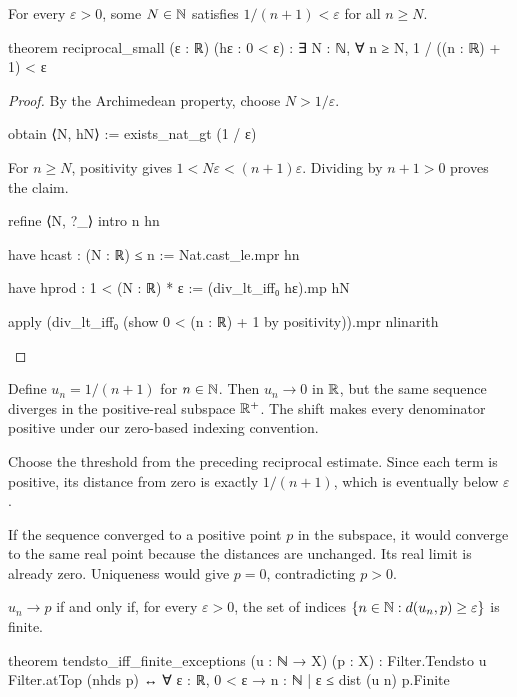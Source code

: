 \begin{lemma}
  \label{ma:lem:reciprocal-small}
  For every $\varepsilon>0$, some $N\in\mathbb{N}$ satisfies $1/(n+1)<\varepsilon$ for all $n\geq N$.

  \begin{lean}
    theorem reciprocal_small (ε : ℝ) (hε : 0 < ε) :
        ∃ N : ℕ, ∀ n ≥ N, 1 / ((n : ℝ) + 1) < ε
  \end{lean}
\end{lemma}

\begin{proof}
  By the Archimedean property, choose $N>1/\varepsilon$.

  \begin{lean}
    obtain ⟨N, hN⟩ := exists_nat_gt (1 / ε)
  \end{lean}

  For $n\ge N$, positivity gives $1<N\varepsilon<(n+1)\varepsilon$.
  Dividing by $n+1>0$ proves the claim.

  \begin{lean}
    refine ⟨N, ?_⟩
    intro n hn

    have hcast : (N : ℝ) ≤ n := Nat.cast_le.mpr hn

    have hprod : 1 < (N : ℝ) * ε := (div_lt_iff₀ hε).mp hN

    apply (div_lt_iff₀ (show 0 < (n : ℝ) + 1 by positivity)).mpr
    nlinarith
  \end{lean}
\end{proof}

\begin{example}
  Define $u_n=1/(n+1)$ for $n\in\mathbb{N}$.
  Then $u_n\to0$ in $\mathbb{R}$, but the same sequence diverges in the positive-real subspace $\mathbb{R}^{+}$.
  The shift makes every denominator positive under our zero-based indexing convention.

  Choose the threshold from the preceding reciprocal estimate.
  Since each term is positive, its distance from zero is exactly $1/(n+1)$, which is eventually
  below $\varepsilon$.

  If the sequence converged to a positive point $p$ in the subspace, it would converge to the same
  real point because the distances are unchanged.
  Its real limit is already zero.
  Uniqueness would give $p=0$, contradicting $p>0$.
\end{example}

\begin{lemma}
  \label{ma:lem:convergesTo-iff-finite-exceptions}
  $u_n\to p$ if and only if, for every $\varepsilon>0$, the set of indices $\{n\in\mathbb{N}:d(u_n,p)\geq\varepsilon\}$ is finite.

  \begin{lean}
    theorem tendsto_iff_finite_exceptions (u : ℕ → X) (p : X) :
        Filter.Tendsto u Filter.atTop (nhds p) ↔ ∀ ε : ℝ, 0 < ε → {n : ℕ | ε ≤ dist (u n) p}.Finite
  \end{lean}
\end{lemma}

